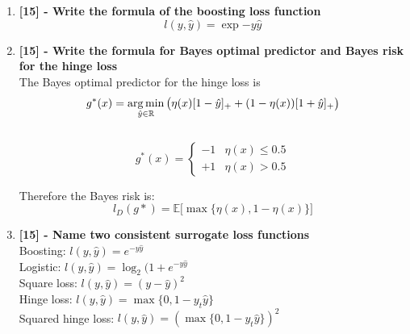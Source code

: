 \documentclass[a4paper]{report}
\DeclareMathOperator*{\argmin}{arg\,min}
\begin{document}
\begin{enumerate}
    \item \textbf{[15] - Write the formula of the boosting loss function}\\
    \[l(y, \hat{y}) = \exp{-y\hat{y}}\]
    \item \textbf{[15] - Write the formula for Bayes optimal predictor and Bayes risk for the hinge loss}\\
    The Bayes optimal predictor for the hinge loss is \[g^* (x) = \argmin_{\hat{y} \in \mathbb{R}}\big(\eta\small(x\small)[1-\hat{y}]_+ + (1-\eta\small(x\small))[1+\hat{y}]_+\big)\]\\
    \[
    g^* (x) = 
    \begin{cases}
    -1 &\eta(x) \leq 0.5\\
    +1 &\eta(x) > 0.5    
    \end{cases}
    \]

    Therefore the Bayes risk is:
    \[
    l_D (g*) = \mathbb{E} \big[\max\{{\eta(x), 1 - \eta(x)}\}\big]
    \]
    \item \textbf{[15] - Name two consistent surrogate loss functions}\\
        Boosting: $l(y, \hat{y}) = e^{-y\hat{y}}$\\
        Logistic: $l(y, \hat{y}) = \log_2 (1 + e^{-y\hat{y}}$\\
        Square loss: $l(y, \hat{y}) = (y - \hat{y})^2$\\
        Hinge loss: $l(y, \hat{y}) = \max\{0, 1 - y_t \hat{y}\}$\\
        Squared hinge loss: $l(y, \hat{y}) = (\max\{0, 1 - y_t \hat{y}\})^2$
\end{enumerate}
\end{document}
